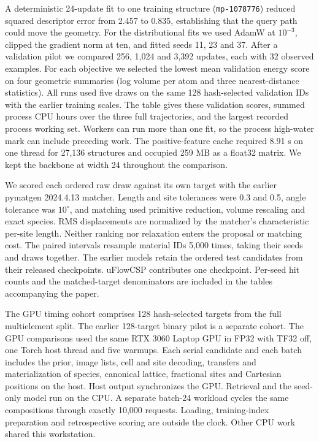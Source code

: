 A deterministic 24-update fit to one training structure (\texttt{mp-1078776}) reduced squared descriptor error from 2.457 to 0.835, establishing that the query path could move the geometry. For the distributional fits we used AdamW at $10^{-3}$, clipped the gradient norm at ten, and fitted seeds 11, 23 and 37. After a validation pilot we compared 256, 1,024 and 3,392 updates, each with 32 observed examples. For each objective we selected the lowest mean validation energy score on four geometric summaries (log volume per atom and three nearest-distance statistics). All runs used five draws on the same 128 hash-selected validation IDs with the earlier training scales. The table gives these validation scores, summed process CPU hours over the three full trajectories, and the largest recorded process working set. Workers can run more than one fit, so the process high-water mark can include preceding work. The positive-feature cache required 8.91 s on one thread for 27,136 structures and occupied 259 MB as a float32 matrix. We kept the backbone at width 24 throughout the comparison.

We scored each ordered raw draw against its own target with the earlier pymatgen 2024.4.13 matcher. Length and site tolerances were 0.3 and 0.5, angle tolerance was $10^\circ$, and matching used primitive reduction, volume rescaling and exact species. RMS displacements are normalized by the matcher's characteristic per-site length. Neither ranking nor relaxation enters the proposal or matching cost. The paired intervals resample material IDs 5,000 times, taking their seeds and draws together. The earlier models retain the ordered test candidates from their released checkpoints. uFlowCSP contributes one checkpoint. Per-seed hit counts and the matched-target denominators are included in the tables accompanying the paper.

The GPU timing cohort comprises 128 hash-selected targets from the full multielement split. The earlier 128-target binary pilot is a separate cohort. The GPU comparisons used the same RTX 3060 Laptop GPU in FP32 with TF32 off, one Torch host thread and five warmups. Each serial candidate and each batch includes the prior, image lists, cell and site decoding, transfers and materialization of species, canonical lattice, fractional sites and Cartesian positions on the host. Host output synchronizes the GPU. Retrieval and the seed-only model run on the CPU. A separate batch-24 workload cycles the same compositions through exactly 10,000 requests. Loading, training-index preparation and retrospective scoring are outside the clock. Other CPU work shared this workstation.
